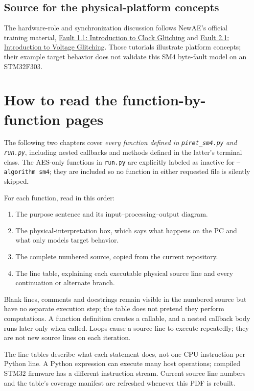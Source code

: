 \section{Source for the physical-platform concepts}
The hardware-role and synchronization discussion follows NewAE's official training material, \href{https://github.com/newaetech/chipwhisperer-tutorials/blob/master/courses_fault101_SOLN_Fault%201_1%20-%20Introduction%20to%20Clock%20Glitching-OPENADC-CWLITEARM.rst}{Fault 1.1: Introduction to Clock Glitching} and \href{https://github.com/newaetech/chipwhisperer-tutorials/blob/master/courses_fault101_SOLN_Fault%202_1%20-%20Introduction%20to%20Voltage%20Glitching-OPENADC-CWLITEARM.rst}{Fault 2.1: Introduction to Voltage Glitching}. Those tutorials illustrate platform concepts; their example target behavior does not validate this SM4 byte-fault model on an STM32F303.

\chapter{How to read the function-by-function pages}
The following two chapters cover \emph{every function defined in \texttt{piret\_sm4.py} and \texttt{run.py}}, including nested callbacks and methods defined in the latter's terminal class. The AES-only functions in \texttt{run.py} are explicitly labeled as inactive for \texttt{--algorithm sm4}; they are included so no function in either requested file is silently skipped.

For each function, read in this order:
\begin{enumerate}
\item The purpose sentence and its input--processing--output diagram.
\item The physical-interpretation box, which says what happens on the PC and what only models target behavior.
\item The complete numbered source, copied from the current repository.
\item The line table, explaining each executable physical source line and every continuation or alternate branch.
\end{enumerate}
Blank lines, comments and docstrings remain visible in the numbered source but have no separate execution step; the table does not pretend they perform computations. A function definition creates a callable, and a nested callback body runs later only when called. Loops cause a source line to execute repeatedly; they are not new source lines on each iteration.

The line tables describe what each statement does, not one CPU instruction per Python line. A Python expression can execute many host operations; compiled STM32 firmware has a different instruction stream. Current source line numbers and the table's coverage manifest are refreshed whenever this PDF is rebuilt.
